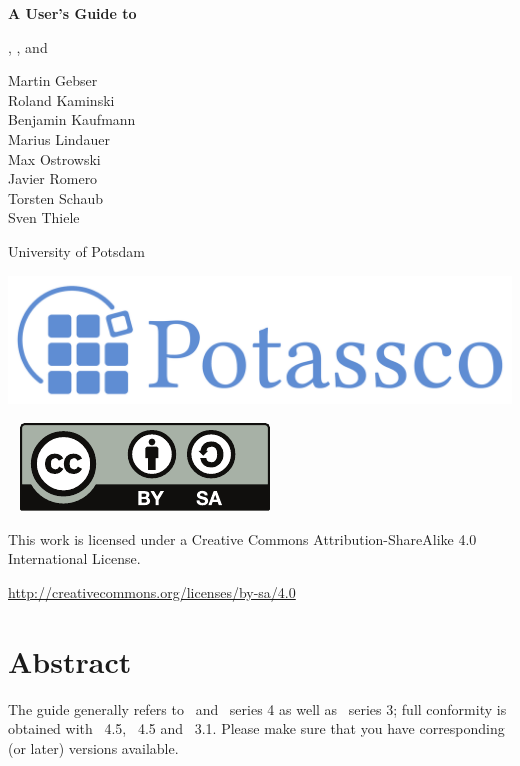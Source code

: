 \thispagestyle{empty}
\bigskip
\noindent
{\Huge\bf
A User's Guide to 
\par
\bigskip
\noindent
\gringo, \clasp, and \clingo}

\bigskip
\bigskip

\noindent
Martin Gebser \\
Roland Kaminski \\
Benjamin Kaufmann \\
Marius Lindauer \\
Max Ostrowski \\
Javier Romero \\
Torsten Schaub \\
Sven Thiele 
\par
\bigskip
\noindent
University of Potsdam

\vfill

\noindent
\includegraphics[width=\textwidth]{potassco_logo_blue}
\bigskip

\newpage
\thispagestyle{empty}\ 
\vfill
\noindent
\includegraphics{by-sa}

\bigskip

\noindent
This work is licensed under a Creative Commons Attribution-ShareAlike 4.0\\ International License.

\medskip

\noindent
\url{http://creativecommons.org/licenses/by-sa/4.0}
\newpage
\thispagestyle{empty}\ 
\section*{Abstract}


\bigskip
\noindent
The guide generally refers to \gringo\ and \clingo\ series 4 as well as \clasp\ series 3;
full conformity is obtained with \gringo~4.5, \clingo~4.5 and \clasp~3.1.
Please make sure that you have corresponding (or later) versions available.

